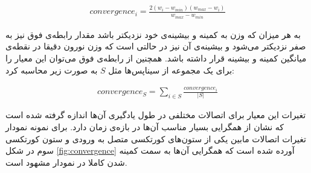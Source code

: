 \documentclass[12pt]{report}
\begin{document}
	\begin{align}
		convergence_i = \frac{2 (w_i - w_{min})(w_{max} - w_i) }{ w_{max} - w_{min} }
		\label{eq:convergence_single}
	\end{align}

	به هر میزان که وزن به کمینه و بیشینه‌ی خود نزدیکتر باشد مقدار رابطه‌ی فوق نیز به صفر نزدیکتر می‌شود و بیشینه‌ی آن نیز در حالتی است که وزن نورون دقیقا در نقطه‌ی میانگین کمینه و بیشینه قرار داشته باشد. همچنین از رابطه‌ی فوق می‌توان این معیار را برای یک مجموعه از سیناپس‌ها مثل $S$ به صورت زیر محاسبه کرد:
	
	\begin{align}
		convergence_{S} = \sum_{i \in S} \frac{convergence_i}{|S|} 
		\label{eq:convergence_pop}
	\end{align}
	
	تغیرات این معیار برای اتصالات مختلفی در طول یادگیری آن‌ها اندازه گرفته شده است که نشان از همگرایی بسیار مناسب آن‌ها در بازه‌ی زمان دارد. برای نمونه نمودار تغیرات اتصالات مابین یکی از ستون‌های کورتکسی متصل به ورودی و ستون کورتکسی سوم در شکل \ref{fig:convergence} آورده شده است که همگرایی آن‌ها به سمت کمینه شدن کاملا در نمودار مشهود است.
	
\end{document}
